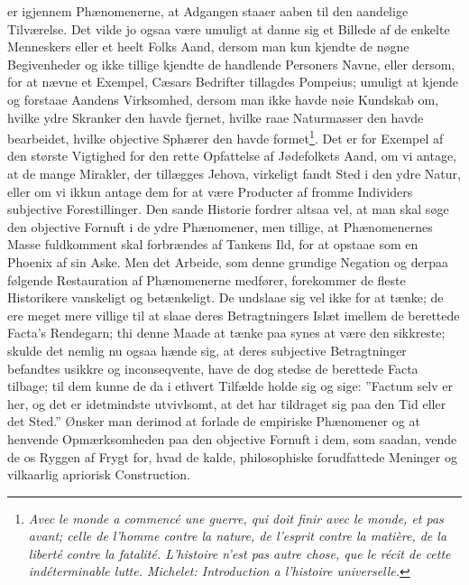 \documentclass[12pt]{book}
\newcommand{\opage}[1]{\marginnote{\footnotesize\textit{[#1]}}}
\begin{document}
er igjennem Phænomenerne, at Adgangen staaer aaben til den aandelige Tilværelse.
Det vilde jo ogsaa være umuligt at danne sig et Billede af de enkelte Menneskers
eller et heelt Folks Aand, dersom man kun kjendte de nøgne Begivenheder og ikke
tillige kjendte de handlende Personers Navne, eller dersom, for at nævne et
Exempel, Cæsars Bedrifter tillagdes Pompeius; umuligt at kjende og forstaae
Aandens Virksomhed, dersom man ikke havde nøie Kundskab om, hvilke ydre Skranker
den havde fjernet, hvilke raae Naturmasser den havde bearbeidet, hvilke
objective Sphærer den havde formet\footnote{\textit{Avec le monde a commencé une
guerre, qui doit finir avec le monde, et pas avant; celle de l'homme contre la
nature, de l'esprit contre la matière, de la liberté contre la fatalité.
L'histoire n'est pas autre chose, que le récit de cette indéterminable lutte.
Michelet: Introduction a l'histoire universelle.}}. Det er for Exempel af den
største Vigtighed for den rette Opfattelse af Jødefolkets Aand, om vi antage, at
de mange Mirakler, der tillægges Jehova, virkeligt fandt Sted i den ydre Natur,
eller om vi ikkun antage dem for at være Producter af fromme Individers
subjective Forestillinger.
\opage{20} Den sande Historie fordrer altsaa vel, at man skal søge den objective Fornuft i
de ydre Phænomener, men tillige, at Phænomenernes Masse fuldkomment skal
forbrændes af Tankens Ild, for at opstaae som en Phoenix af sin Aske. Men det
Arbeide, som denne grundige Negation og derpaa følgende Restauration af
Phænomenerne medfører, forekommer de fleste Historikere vanskeligt og
betænkeligt. De undslaae sig vel ikke for at tænke; de ere meget mere villige
til at slaae deres Betragtningers Islæt imellem de berettede Facta's Rendegarn;
thi denne Maade at tænke paa synes at være den sikkreste; skulde det nemlig nu
ogsaa hænde sig, at deres subjective Betragtninger befandtes usikkre og
inconseqvente, have de dog stedse de berettede Facta tilbage; til dem kunne de
da i ethvert Tilfælde holde sig og sige: ”Factum selv er her, og det er
idetmindste utvivlsomt, at det har tildraget sig paa den Tid eller det Sted.”
Ønsker man derimod at forlade de empiriske Phænomener og at henvende
Opmærksomheden paa den objective Fornuft i dem, som saadan, vende de os Ryggen
af Frygt for, hvad de kalde, philosophiske forudfattede Meninger og vilkaarlig
apriorisk Construction.
\end{document}
